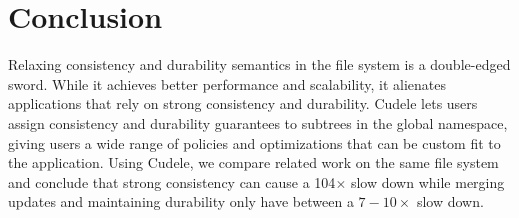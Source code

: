 %
%
%
%
%
%
%

\section{Conclusion}

Relaxing consistency and durability semantics in the file system is a
double-edged sword. While it achieves better performance and scalability, it
alienates applications that rely on strong consistency and durability. Cudele
lets users assign consistency and durability guarantees to subtrees in
the global namespace, giving users a wide range of policies and
optimizations that can be custom fit to the application. Using Cudele, we
compare related work on the same file system and conclude that strong
consistency can cause a 104\(\times\) slow down while merging updates and
maintaining durability only have between a \(7-10\times\) slow down.




